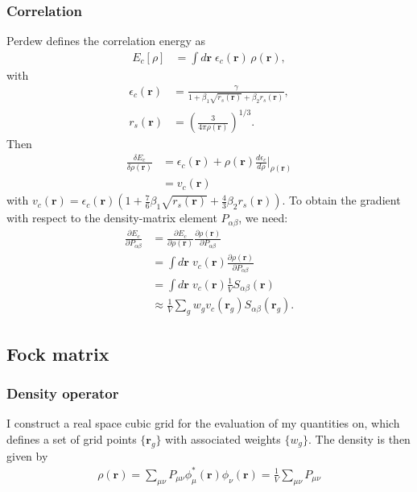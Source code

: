 \subsubsection{Correlation}
Perdew defines the correlation energy as
\begin{align}
  E_c[\rho]
  &= \int d\mathbf r\; \epsilon _c(\mathbf r)\,\rho(\mathbf r),
\end{align}
with
\begin{align}
  \epsilon_c(\mathbf r)
  &= \frac{\gamma}{1 + \beta_1 \sqrt{r_s(\mathbf r)} + \beta_2 r_s(\mathbf r)},\\
  r_s(\mathbf r)
  &= \left(\frac{3}{4\pi\rho(\mathbf r)}\right)^{1/3}.
\end{align}
Then
\begin{align}
  \frac{\delta E_c}{\delta\rho(\mathbf r)}
  &= \epsilon_c(\mathbf r) + \rho(\mathbf r)\frac{d\epsilon_c}{d\rho}\Big|_{\rho(\mathbf r)} \\
  &= v_c(\mathbf r)
\end{align}
with $  v_c(\mathbf r) = \epsilon_c(\mathbf r)
     \left(
       1 + \frac{7}{6}\beta_1 \sqrt{r_s(\mathbf r)}
         + \frac{4}{3}\beta_2 r_s(\mathbf r)
     \right)$. To obtain the gradient with respect to the density-matrix element
$P_{\alpha\beta}$, we need:
\begin{align}
  \frac{\partial E_c}{\partial P_{\alpha\beta}}
  &= \frac{\partial E_c}{\partial \rho(\mathbf r)} \frac{\partial \rho(\mathbf r)}{\partial P_{\alpha\beta}} \\
  &= \int d\mathbf r\; v_c(\mathbf r) \frac{\partial \rho(\mathbf r)}{\partial P_{\alpha\beta}} \\
  &= \int d\mathbf r\; v_c(\mathbf r) \frac{1}{V} S_{\alpha\beta}(\mathbf r) \\
&\approx \frac{1}{V} \sum_g w_g v_c(\mathbf r_g) S_{\alpha\beta}(\mathbf r_g).
\end{align}
\subsection{Fock matrix}
\subsubsection{Density operator}
I construct a real space cubic grid for the evaluation of my quantities on, which defines a set of grid points $\{\mathbf r_g\}$ with associated weights $\{w_g\}$. The density is then given by
\begin{align}
{\rho}(\mathbf r) = \sum_{\mu\nu} P_{\mu\nu} \phi_\mu^*(\mathbf r) \phi_\nu(\mathbf r) = \frac{1}{V} \sum_{\mu\nu} P_{\mu\nu} 
\end{align}
